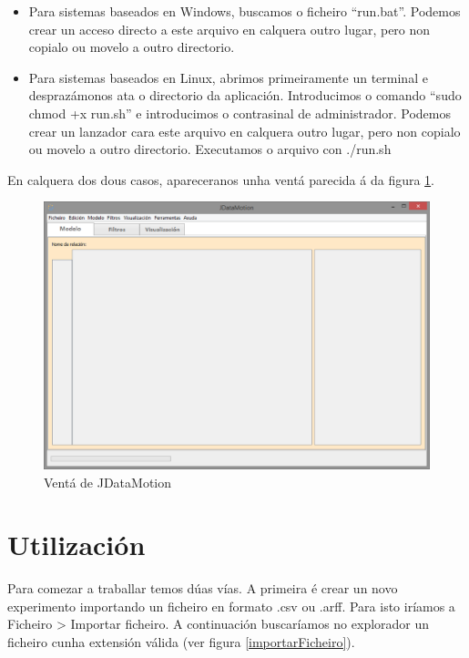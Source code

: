 \begin{itemize}
\item Para sistemas baseados en Windows, buscamos o ficheiro ``run.bat''. Podemos crear un acceso directo a este arquivo en calquera outro lugar, pero non copialo ou movelo a outro directorio.
\item Para sistemas baseados en Linux, abrimos primeiramente un terminal e desprazámonos ata o directorio da aplicación. Introducimos o comando ``sudo chmod +x run.sh'' e introducimos o contrasinal de administrador. Podemos crear un lanzador cara este arquivo en calquera outro lugar, pero non copialo ou movelo a outro directorio. Executamos o arquivo con ./run.sh
\end{itemize}

En calquera dos dous casos, apareceranos unha ventá parecida á da figura \ref{inicial}.

\begin{figure}
\centering
\includegraphics[width=\textwidth,height=\textheight,keepaspectratio]{figuras/inicial}
\caption{Ventá de JDataMotion}
\label{inicial}
\end{figure}

\section{Utilización}

Para comezar a traballar temos dúas vías. A primeira é crear un novo experimento importando un ficheiro en formato .csv ou .arff. Para isto iríamos a Ficheiro \textgreater{} Importar ficheiro. A continuación buscaríamos no explorador un ficheiro cunha extensión válida (ver figura \ref{importarFicheiro}).

